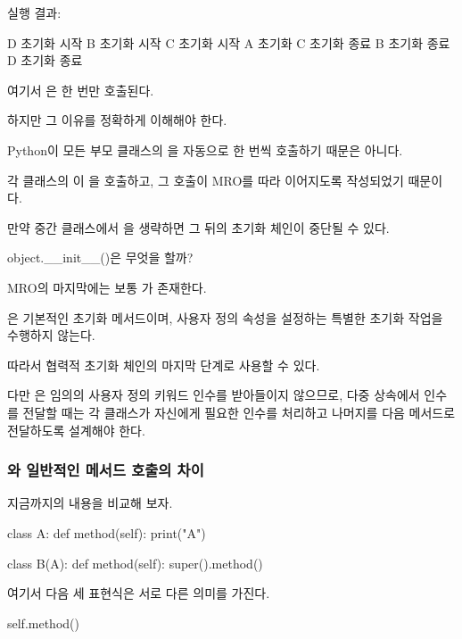 실행 결과:

\begin{dhkzsh}
D 초기화 시작
B 초기화 시작
C 초기화 시작
A 초기화
C 초기화 종료
B 초기화 종료
D 초기화 종료
\end{dhkzsh}

여기서 은 한 번만 호출된다.

하지만 그 이유를 정확하게 이해해야 한다.

Python이 모든 부모 클래스의 을 자동으로 한 번씩 호출하기 때문은 아니다.

각 클래스의 이 을 호출하고, 그 호출이 MRO를 따라 이어지도록 작성되었기 때문이다.

만약 중간 클래스에서 을 생략하면 그 뒤의 초기화 체인이 중단될 수 있다.

\begin{dhknote}
\begin{dhksmry}[centered]
object.__init__()은 무엇을 할까?
\end{dhksmry}
\end{dhknote}

MRO의 마지막에는 보통 가 존재한다.

은 기본적인 초기화 메서드이며, 사용자 정의 속성을 설정하는 특별한 초기화 작업을 수행하지 않는다.

따라서 협력적 초기화 체인의 마지막 단계로 사용할 수 있다.

다만 은 임의의 사용자 정의 키워드 인수를 받아들이지 않으므로, 다중 상속에서 인수를 전달할 때는 각 클래스가 자신에게 필요한 인수를 처리하고 나머지를 다음 메서드로 전달하도록 설계해야 한다.

\subsubsection{와 일반적인 메서드 호출의 차이}

지금까지의 내용을 비교해 보자.

\begin{dhkcode}
class A:
    def method(self):
        print("A")


class B(A):
    def method(self):
        super().method()
\end{dhkcode}

여기서 다음 세 표현식은 서로 다른 의미를 가진다.

\begin{dhkcode}
self.method()
\end{dhkcode}

